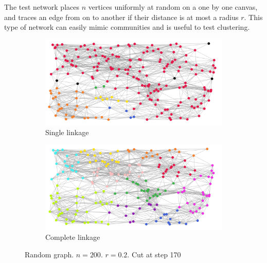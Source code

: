 \documentclass[12pt,a4paper]{article}
\begin{document}
The test network places $n$ vertices uniformly at random on a one by
one canvas, and traces an edge from on to another if their distance is
at most a radius $r$. This type of network can easily mimic
communities and is useful to test clustering.

\begin{figure}
  \centering
  \begin{subfigure}[h]{0.8\textwidth}
    \includegraphics[width=\linewidth]{img/slink-200-170-02.png}
    \caption{Single linkage}
  \end{subfigure}
  \begin{subfigure}[h]{0.8\textwidth}
    \includegraphics[width=\linewidth]{img/clink-200-170-02.png}
    \caption{Complete linkage}
  \end{subfigure}
  \caption{Random graph. $n = 200$. $r = 0.2$. Cut at step 170}
  \label{fig:170-0.2}
\end{figure}
\end{document}
